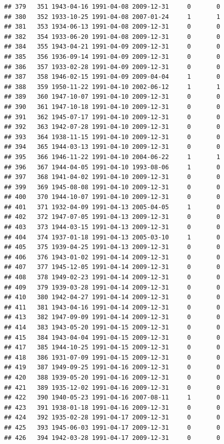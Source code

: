 \documentclass[
]{book}
\theoremstyle{definition}
\theoremstyle{definition}
\theoremstyle{definition}
\theoremstyle{definition}
\theoremstyle{remark}
\begin{document}
\begin{verbatim}
## 379   351 1943-04-16 1991-04-08 2009-12-31     0       0
## 380   352 1933-10-25 1991-04-08 2007-01-24     1       1
## 381   353 1934-06-13 1991-04-08 2009-12-31     0       0
## 382   354 1933-06-20 1991-04-08 2009-12-31     0       0
## 384   355 1943-04-21 1991-04-09 2009-12-31     0       0
## 385   356 1936-09-14 1991-04-09 2009-12-31     0       0
## 386   357 1933-02-28 1991-04-09 2009-12-31     0       0
## 387   358 1946-02-15 1991-04-09 2009-04-04     1       0
## 388   359 1950-11-22 1991-04-10 2002-06-12     1       1
## 389   360 1947-10-07 1991-04-10 2009-12-31     0       0
## 390   361 1947-10-18 1991-04-10 2009-12-31     0       0
## 391   362 1945-07-17 1991-04-10 2009-12-31     0       0
## 392   363 1942-07-28 1991-04-10 2009-12-31     0       0
## 393   364 1938-11-15 1991-04-10 2009-12-31     0       0
## 394   365 1944-03-13 1991-04-10 2009-12-31     0       0
## 395   366 1946-11-22 1991-04-10 2004-06-22     1       1
## 396   367 1944-04-05 1991-04-10 1993-08-06     1       0
## 397   368 1941-04-02 1991-04-10 2009-12-31     0       0
## 399   369 1945-08-08 1991-04-10 2009-12-31     0       0
## 400   370 1944-10-07 1991-04-10 2009-12-31     0       0
## 401   371 1932-04-09 1991-04-13 2005-04-05     1       0
## 402   372 1947-07-05 1991-04-13 2009-12-31     0       0
## 403   373 1944-03-15 1991-04-13 2009-12-31     0       0
## 404   374 1937-01-18 1991-04-13 2005-03-10     1       0
## 405   375 1939-04-25 1991-04-13 2009-12-31     0       0
## 406   376 1943-01-02 1991-04-14 2009-12-31     0       0
## 407   377 1945-12-05 1991-04-14 2009-12-31     0       0
## 408   378 1949-02-23 1991-04-14 2009-12-31     0       0
## 409   379 1939-03-28 1991-04-14 2009-12-31     0       0
## 410   380 1942-04-27 1991-04-14 2009-12-31     0       0
## 411   381 1943-04-16 1991-04-14 2009-12-31     0       0
## 413   382 1947-09-09 1991-04-14 2009-12-31     0       0
## 414   383 1943-05-20 1991-04-15 2009-12-31     0       0
## 415   384 1943-04-04 1991-04-15 2009-12-31     0       0
## 417   385 1944-10-25 1991-04-15 2009-12-31     0       0
## 418   386 1931-07-09 1991-04-15 2009-12-31     0       0
## 419   387 1949-09-25 1991-04-16 2009-12-31     0       0
## 420   388 1939-05-20 1991-04-16 2009-12-31     0       0
## 421   389 1935-12-02 1991-04-16 2009-12-31     0       0
## 422   390 1940-05-23 1991-04-16 2007-08-11     1       0
## 423   391 1938-01-18 1991-04-16 2009-12-31     0       0
## 424   392 1935-02-28 1991-04-17 2009-12-31     0       0
## 425   393 1945-06-03 1991-04-17 2009-12-31     0       0
## 426   394 1942-03-28 1991-04-17 2009-12-31     0       0

\end{verbatim}
\end{document}
